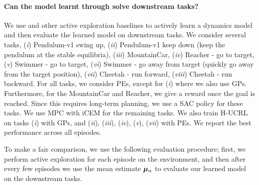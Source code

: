 \paragraph{Can the model learnt through \opacex solve downstream tasks?}
We use \opacex and other active exploration baselines to actively learn a dynamics model and then evaluate the learned model on downstream tasks. We consider several tasks, (\emph{i}) Pendulum-v1 swing up, (\emph{ii})  Pendulum-v1 keep down (keep the pendulum at the stable equilibria), (\emph{iii}) MountainCar, (\emph{iv}) Reacher - go to target, (\emph{v}) Swimmer - go to target, 
(\emph{vi}) Swimmer - go away from target (quickly go away from the target position), 
(\emph{vii}) Cheetah - run forward, (\emph{viii}) Cheetah - run backward. For all tasks, we consider PEs, except for (\emph{i}) where we also use GPs. Furthermore,
for the MountainCar and Reacher, we give a reward once the goal is reached. Since this requires long-term planning, we use a SAC policy for these tasks. We use MPC with iCEM for the remaining tasks. We also train \textsc{H-UCRL} on tasks (\emph{i}) with GPs, and (\emph{ii}), (\emph{iii}), (\emph{iv}), (\emph{v}), (\emph{vii}) with PEs. We report the best performance across all episodes. 

To make a fair comparison, we use the following evaluation procedure; first, we perform active exploration for each episode on the environment, and then after every few episodes we use the mean estimate ${\bm{\mu}}_n$ to evaluate our learned model on the downstream tasks. 

